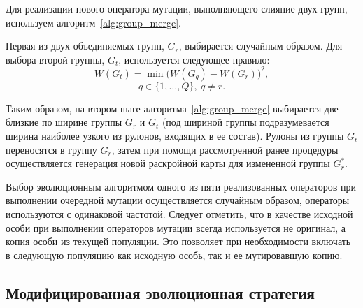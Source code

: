 \documentclass[12pt]{article}
\begin{document}
Для реализации нового оператора мутации, выполняющего слияние двух групп, 
используем алгоритм~\ref{alg:group_merge}.

Первая из двух объединяемых групп, $G_r$, выбирается случайным образом. 
Для выбора второй группы, $G_t$, используется следующее правило:
\[ W(G_t)=\min{\bigl( W(G_q) - W(G_r) \bigr)^2}, \]
\[ q \in \{1,\ldots,Q\}, \: q \neq r. \]

Таким образом, на втором шаге алгоритма~\ref{alg:group_merge}
выбирается две близкие по ширине группы $G_r$ и 
$G_t$ (под шириной группы подразумевается ширина наиболее узкого из рулонов, 
входящих в ее состав). Рулоны из группы $G_t$ переносятся в группу $G_r$, 
затем при помощи рассмотренной ранее процедуры осуществляется генерация новой 
раскройной карты для измененной группы $G_r^*$.

Выбор эволюционным алгоритмом одного из пяти реализованных операторов при 
выполнении очередной мутации осуществляется случайным образом, операторы 
используются с одинаковой частотой. Следует отметить, что в качестве исходной 
особи при выполнении операторов мутации всегда используется не оригинал, а 
копия особи из текущей популяции. Это позволяет при необходимости включать в 
следующую популяцию как исходную особь, так и ее мутировавшую копию.

\subsection{Модифицированная эволюционная стратегия}
\end{document}
